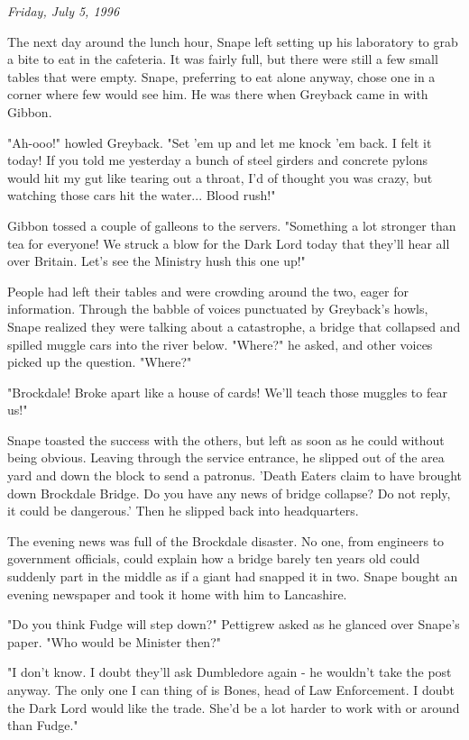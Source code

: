 \documentclass[a4paper,11pt]{article}
\begin{document}
\emph{Friday, July 5, 1996}

The next day around the lunch hour, Snape left setting up his laboratory to grab a bite to eat in the cafeteria. It was fairly full, but there were still a few small tables that were empty. Snape, preferring to eat alone anyway, chose one in a corner where few would see him. He was there when Greyback came in with Gibbon.

"Ah-ooo!" howled Greyback. "Set 'em up and let me knock 'em back. I felt it today! If you told me yesterday a bunch of steel girders and concrete pylons would hit my gut like tearing out a throat, I'd of thought you was crazy, but watching those cars hit the water... Blood rush!"

Gibbon tossed a couple of galleons to the servers. "Something a lot stronger than tea for everyone! We struck a blow for the Dark Lord today that they'll hear all over Britain. Let's see the Ministry hush this one up!"

People had left their tables and were crowding around the two, eager for information. Through the babble of voices punctuated by Greyback's howls, Snape realized they were talking about a catastrophe, a bridge that collapsed and spilled muggle cars into the river below. "Where?" he asked, and other voices picked up the question. "Where?"

"Brockdale! Broke apart like a house of cards! We'll teach those muggles to fear us!"

Snape toasted the success with the others, but left as soon as he could without being obvious. Leaving through the service entrance, he slipped out of the area yard and down the block to send a patronus. 'Death Eaters claim to have brought down Brockdale Bridge. Do you have any news of bridge collapse? Do not reply, it could be dangerous.' Then he slipped back into headquarters.

The evening news was full of the Brockdale disaster. No one, from engineers to government officials, could explain how a bridge barely ten years old could suddenly part in the middle as if a giant had snapped it in two. Snape bought an evening newspaper and took it home with him to Lancashire.

"Do you think Fudge will step down?" Pettigrew asked as he glanced over Snape's paper. "Who would be Minister then?"

"I don't know. I doubt they'll ask Dumbledore again - he wouldn't take the post anyway. The only one I can thing of is Bones, head of Law Enforcement. I doubt the Dark Lord would like the trade. She'd be a lot harder to work with or around than Fudge."
\end{document}
